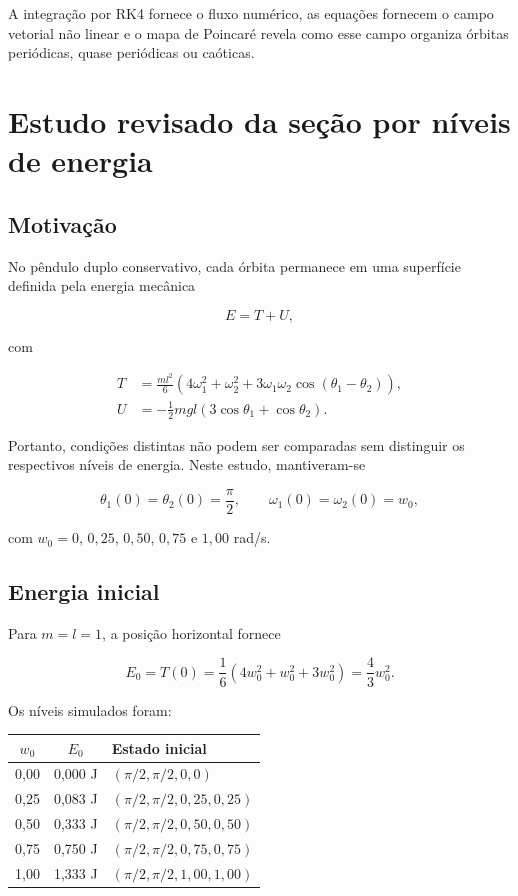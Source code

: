 \documentclass[12pt,a4paper]{article}
\begin{document}
A integração por RK4 fornece o fluxo numérico, as equações fornecem o campo vetorial não linear e o mapa de Poincaré revela como esse campo organiza órbitas periódicas, quase periódicas ou caóticas.

\section{Estudo revisado da seção por níveis de energia}

\subsection{Motivação}

No pêndulo duplo conservativo, cada órbita permanece em uma superfície definida pela energia mecânica

\begin{equation}
E=T+U,
\end{equation}

com

\begin{align}
T&=\frac{ml^2}{6}\left(4\omega_1^2+\omega_2^2
+3\omega_1\omega_2\cos(\theta_1-\theta_2)\right),\\
U&=-\frac12mgl\left(3\cos\theta_1+\cos\theta_2\right).
\end{align}

Portanto, condições distintas não podem ser comparadas sem distinguir os respectivos níveis de energia. Neste estudo, mantiveram-se

\begin{equation}
\theta_1(0)=\theta_2(0)=\frac{\pi}{2},
\qquad
\omega_1(0)=\omega_2(0)=w_0,
\end{equation}

com $w_0=0$, $0{,}25$, $0{,}50$, $0{,}75$ e $1{,}00$ rad/s.

\subsection{Energia inicial}

Para $m=l=1$, a posição horizontal fornece

\begin{equation}
E_0=T(0)
=\frac{1}{6}\left(4w_0^2+w_0^2+3w_0^2\right)
=\frac{4}{3}w_0^2.
\end{equation}

Os níveis simulados foram:

\begin{center}
\begin{tabular}{ccl}
\toprule
$w_0$ & $E_0$ & Estado inicial\\
\midrule
0,00 & 0,000 J & $(\pi/2,\pi/2,0,0)$\\
0,25 & 0,083 J & $(\pi/2,\pi/2,0{,}25,0{,}25)$\\
0,50 & 0,333 J & $(\pi/2,\pi/2,0{,}50,0{,}50)$\\
0,75 & 0,750 J & $(\pi/2,\pi/2,0{,}75,0{,}75)$\\
1,00 & 1,333 J & $(\pi/2,\pi/2,1{,}00,1{,}00)$\\
\bottomrule
\end{tabular}
\end{center}
\end{document}
